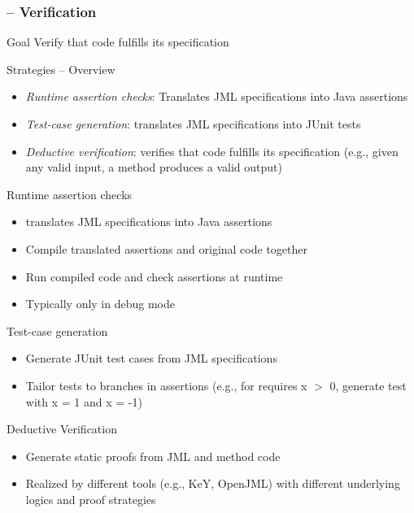 \begin{frame}
	\frametitle{\insertsubsection{} -- Verification}
		\begin{fancycolumns}[widths={40,60}]
			\begin{motivation}{Goal}
				Verify that code fulfills its specification
			\end{motivation}
			\begin{definition}{Strategies -- Overview}
				\begin{itemize}
					\item \emph{Runtime assertion checks}: Translates JML specifications into Java assertions
					\item \emph{Test-case generation}: translates JML specifications into JUnit tests
					\item \emph{Deductive verification}: verifies that code fulfills its specification (e.g., given any valid input, a method produces a valid output)
				\end{itemize}
			\end{definition}
			\nextcolumn
			\begin{definition}{Runtime assertion checks}
				\begin{itemize}
					\item translates JML specifications into Java assertions
					\item Compile translated assertions and original code together
					\item Run compiled code and check assertions at runtime
					\item Typically only in debug mode
				\end{itemize}
			\end{definition}
			\begin{definition}{Test-case generation}
				\begin{itemize}
					\item Generate JUnit test cases from JML specifications
					\item Tailor tests to branches in assertions (e.g., for \@ requires x $>$ 0, generate test with x = 1 and x = -1)
				\end{itemize}
			\end{definition}
			\begin{definition}{Deductive Verification}
				\begin{itemize}
					\item Generate static proofs from JML and method code
					\item Realized by different tools (e.g., KeY, OpenJML) with different underlying logics and proof strategies 
				\end{itemize}
			\end{definition}
		\end{fancycolumns}
	

\end{frame}

